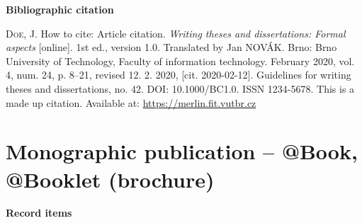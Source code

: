 \bigskip

\noindent \textbf{Bibliographic citation}

\medskip

\noindent \textsc{Doe}, J. How to cite: Article citation. \textit{Writing theses and dissertations: Formal aspects} [online]. 1st ed., version 1.0. Translated by Jan NOVÁK. Brno: Brno University of Technology, Faculty of information technology. February 2020, vol. 4, num. 24, p. 8–21, revised 12. 2. 2020, [cit. 2020-02-12]. Guidelines for writing theses and dissertations, no. 42. DOI: 10.1000/BC1.0. ISSN 1234-5678. This is a made up citation. Available at: \url{https://merlin.fit.vutbr.cz}

\newpage
\section*{Monographic publication -- @Book, @Booklet (brochure)}
\label{pr-monografie}
\noindent \textbf{Record items}

\medskip

